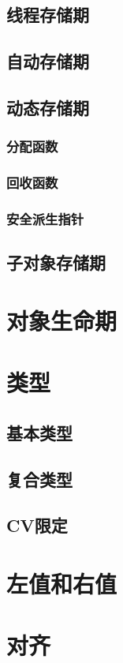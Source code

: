 \subsection{线程存储期}
\subsection{自动存储期}

\subsection{动态存储期}
\subsubsection{分配函数}
\subsubsection{回收函数}
\subsubsection{安全派生指针}

\subsection{子对象存储期}

\section{对象生命期}

\section{类型}
\subsection{基本类型}
\subsection{复合类型}
\subsection{CV限定}

\section{左值和右值}

\section{对齐}
